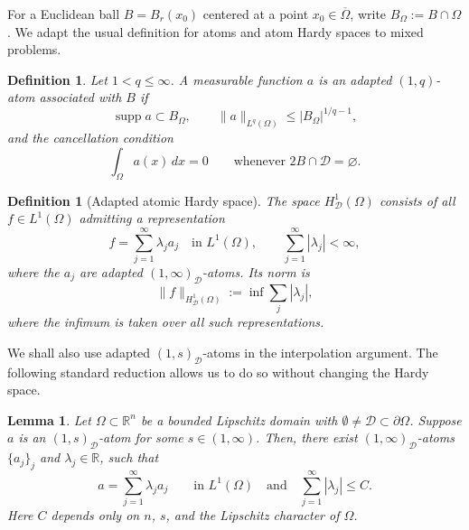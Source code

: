 \documentclass[12pt]{amsart}
\newtheorem{definition}[theorem]{Definition}
\newtheorem{lemma}[theorem]{Lemma}
\numberwithin{equation}{section}
\newcommand{\bR}{\mathbb{R}}
\newcommand\cD{\mathcal{D}}
\begin{document}
For a Euclidean ball $B=B_r(x_0)$ centered at a point
$x_0\in\overline\Omega$, write $B_\Omega :=B\cap\Omega$.
We adapt the usual definition for atoms and atom Hardy spaces to mixed problems.
\begin{definition}
  Let $1<q\leq\infty$.  A measurable function $a$ is an adapted
  $(1,q)$-atom associated with $B$ if
  \begin{equation}
    \operatorname{supp} a\subset B_\Omega,
    \qquad
    \|a\|_{L^q(\Omega)}\leq |B_\Omega|^{1/q-1},
    \label{eq:atom-size}
  \end{equation}
and the cancellation condition
  \begin{equation}
    \int_\Omega a(x)\, dx=0
    \qquad\text{whenever }2B\cap\cD=\varnothing.
    \label{eq:atom-cancellation}
  \end{equation}
\end{definition}

\begin{definition}[Adapted atomic Hardy space]
 The space $H_{\cD}^1(\Omega)$ consists of all $f\in L^1(\Omega)$
 admitting a representation
 \begin{equation}
  f=\sum_{j=1}^\infty\lambda_j a_j
  \quad\text{in }L^1(\Omega),
  \qquad
  \sum_{j=1}^\infty|\lambda_j|<\infty,
  \label{eq:atomic-representation}
 \end{equation}
 where the $a_j$ are adapted $(1,\infty)_{\cD}$-atoms.  Its norm is
 \begin{equation}
  \|f\|_{H_{\cD}^1(\Omega)}
  :=\inf\sum_j|\lambda_j|,
  \label{eq:atomic-norm}
 \end{equation}
 where the infimum is taken over all such representations.
\end{definition}

We shall also use adapted $(1,s)_{\cD}$-atoms in the interpolation
argument.  The following standard reduction allows us to do so without
changing the Hardy space.

\begin{lemma}
\label{lem:atom-decomposition}
Let $\Omega\subset\mathbb R^n$ be a bounded Lipschitz domain with
$\emptyset\neq \mathcal D\subset\partial\Omega$. Suppose $a$ is an $(1,s)_{\mathcal D}$-atom for some $s\in (1,\infty)$. Then, there exist $(1,\infty)_{\mathcal D}$-atoms $\{a_j\}_j$ and $\lambda_j \in \bR$, such that
\[
    a=\sum_{j=1}^\infty \lambda_j a_j
    \qquad\text{in }L^1(\Omega)
    \quad
    \text{and}
    \quad
    \sum_{j=1}^\infty |\lambda_j|\leq C.
\]
Here $C$ depends only on $n$, $s$, and the Lipschitz character of $\Omega$. 
\end{lemma}
\end{document}
